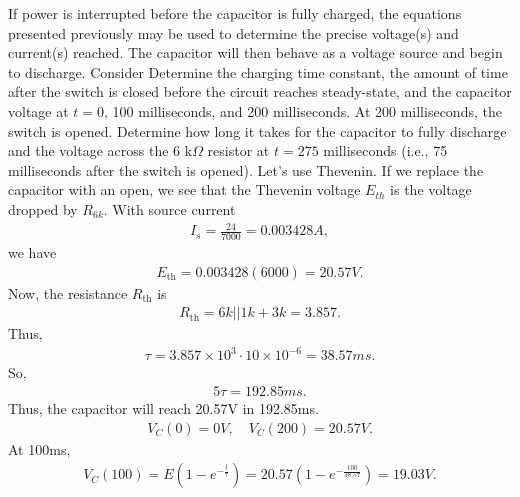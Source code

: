 \documentclass{report}
\begin{document}
\begin{itemize}
            If power is interrupted before the capacitor is fully charged, the equations presented previously may be used to determine the precise voltage(s) and current(s) reached. The capacitor will then behave as a voltage source and begin to discharge.
            \bigbreak \noindent 
            Consider
            \bigbreak \noindent 
            \bigbreak \noindent 
            Determine the charging time constant, the amount of time after the switch is closed before the circuit reaches steady-state, and the capacitor voltage at $t = 0$, 100 milliseconds, and 200 milliseconds. At 200 milliseconds, the switch is opened. Determine how long it takes for the capacitor to fully discharge and the voltage across the 6 k$\Omega$ resistor at $t = 275$ milliseconds (i.e., 75 milliseconds after the switch is opened).
            \bigbreak \noindent 
            Let's use Thevenin. If we replace the capacitor with an open, we see that the Thevenin voltage $E_{th}$ is the voltage dropped by $R_{6k}$. With source current
            \begin{align*}
                I_{s} = \frac{24}{7000} = 0.003428A
            ,\end{align*}
            we have
            \begin{align*}
                E_{\text{th}} = 0.003428(6000) = 20.57V
            .\end{align*}
            Now, the resistance $R_{\text{th}}$ is 
            \begin{align*}
                R_{\text{th}} = 6k || 1k + 3k = 3.857
            .\end{align*}
            Thus,
            \begin{align*}
                \tau = 3.857 \times 10^{3} \cdot 10 \times 10^{-6} = 38.57ms
            .\end{align*}
            So,
            \begin{align*}
               5\tau = 192.85ms 
            .\end{align*}
            Thus, the capacitor will reach 20.57V in 192.85ms.
            \begin{align*}
                V_{C}(0) = 0V, \quad V_{C}(200) = 20.57V
            .\end{align*}
            At 100ms,
            \begin{align*}
                V_{C}(100) = E(1-e^{-\frac{t}{\tau}}) = 20.57\left(1-e^{-\frac{100}{38.57}}\right) = 19.03V
            .\end{align*}

\end{itemize}
\end{document}

